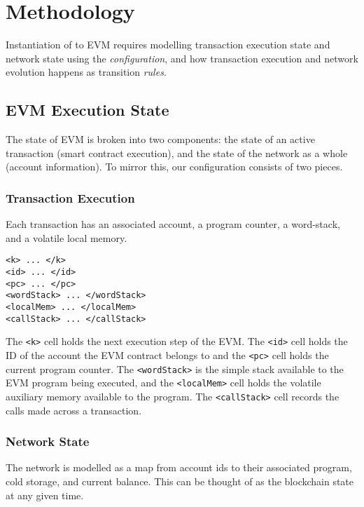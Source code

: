 \section{Methodology}

Instantiation of \K{} to EVM requires modelling transaction execution state and
network state using the \textit{configuration}, and how transaction execution
and network evolution happens as transition \textit{rules}.

\subsection{EVM Execution State}

The state of EVM is broken into two components: the state of an active
transaction (smart contract execution), and the state of the network as a whole
(account information). To mirror this, our configuration consists of two pieces.

\subsubsection{Transaction Execution}

Each transaction has an associated account, a program counter, a word-stack, and
a volatile local memory.

\begin{verbatim}
<k> ... </k>
<id> ... </id>
<pc> ... </pc>
<wordStack> ... </wordStack>
<localMem> ... </localMem>
<callStack> ... </callStack>
\end{verbatim}

The \texttt{<k>} cell holds the next execution step of the EVM.  The
\texttt{<id>} cell holds the ID of the account the EVM contract belongs to and
the \texttt{<pc>} cell holds the current program counter. The
\texttt{<wordStack>} is the simple stack available to the EVM program being
executed, and the \texttt{<localMem>} cell holds the volatile auxiliary memory
available to the program. The \texttt{<callStack>} cell records the calls made
across a transaction.

\subsubsection{Network State}

The network is modelled as a map from account ids to their associated program,
cold storage, and current balance. This can be thought of as the blockchain
state at any given time.

